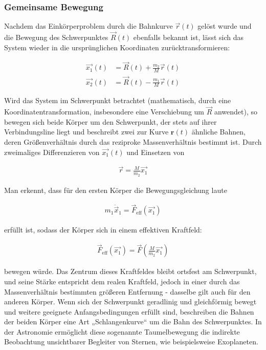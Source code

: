 \documentclass[a4paper,12pt,twoside]{article}
\begin{document}
\subsubsection{Gemeinsame Bewegung}
Nachdem das Einkörperproblem durch die Bahnkurve $\vec{r}(t)$
gelöst wurde und die Bewegung des Schwerpunktes $\vec{R}(t)$
ebenfalls bekannt ist, lässt sich das System wieder in die ursprünglichen Koordinaten zurücktransformieren:

\begin{align*}
	\vec{x_1}(t) &= \vec{R}(t) + \frac{m_2}{M} \vec{r}(t) \\
	\vec{x_2}(t) &= \vec{R}(t) - \frac{m_1}{M} \vec{r}(t)
\end{align*}

Wird das System im Schwerpunkt betrachtet (mathematisch, durch eine Koordinatentransformation, insbesondere eine Verschiebung um \( \vec{R} \) anwendet), so bewegen sich beide Körper um den Schwerpunkt, der stets auf ihrer Verbindungsline liegt und beschreibt zwei zur Kurve \( \mathbf{r}(t) \) ähnliche Bahnen, deren Größenverhältnis durch das reziproke Massenverhältnis bestimmt ist. Durch zweimaliges Differenzieren von \( \vec{x_1}(t) \) und Einsetzen von

\begin{align*}
	\vec{r} = \frac{M}{m_2} \vec{x_1}
\end{align*}

Man erkennt, dass für den ersten Körper die Bewegungsgleichung laute

\begin{align*}
	m_1 \ddot{\vec{x}}_1 = \vec{F}_{\text{eff}}(\vec{x_1})
\end{align*}

erfüllt ist, sodass der Körper sich in einem effektiven Kraftfeld:

\begin{align*}
	\vec{F}_{\text{eff}}(\vec{x_1}) = \vec{F} \left( \frac{M}{m_2} \vec{x_1} \right)
\end{align*}

bewegen würde. Das Zentrum dieses Kraftfeldes bleibt ortsfest am Schwerpunkt, und seine Stärke entspricht dem realen Kraftfeld, jedoch in einer durch das Massenverhältnis bestimmten größeren Entfernung - dasselbe gilt auch für den anderen Körper.
Wenn sich der Schwerpunkt geradlinig und gleichförmig bewegt und weitere geeignete Anfangsbedingungen erfüllt sind, beschreiben die Bahnen der beiden Körper eine Art „Schlangenkurve“ um die Bahn des Schwerpunktes.
In der Astronomie ermöglicht diese sogenannte Taumelbewegung die indirekte Beobachtung unsichtbarer Begleiter von Sternen, wie beispielsweise Exoplaneten.
\end{document}
